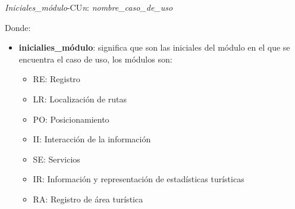 \begin{center}
	\Huge{\textit{Iniciales\_módulo}-CU\textit{n}: \textit{nombre\_caso\_de\_uso}}
\end{center}

Donde: 

\begin{itemize}
	\item \textbf{inicialies\_módulo}: significa que son las iniciales del módulo en el que se encuentra el caso de uso, los módulos son: 
	\begin{itemize}
		\item RE: Registro
		\item LR: Localización de rutas
		\item PO: Posicionamiento
		\item II: Interacción de la información
		\item SE: Servicios
		\item IR: Información y representación de estadísticas turísticas
		\item RA: Registro de área turística
	\end{itemize}
\end{itemize}


